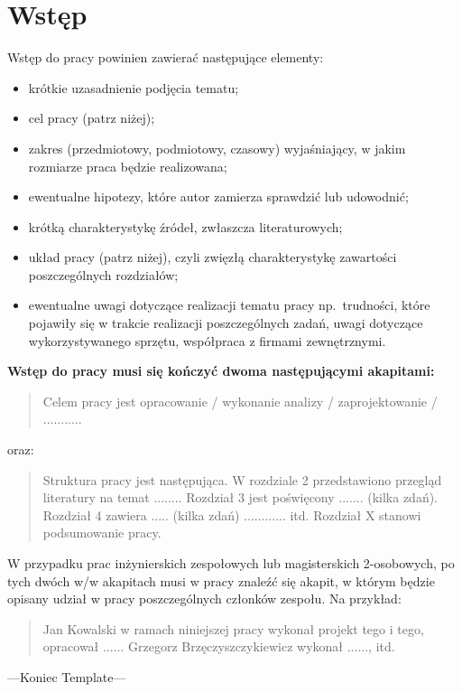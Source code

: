 
\chapter{Wstęp}

Wstęp do pracy powinien zawierać następujące elementy:
\begin{itemize}
    \item krótkie uzasadnienie podjęcia tematu;
    \item cel pracy (patrz niżej);
    \item zakres (przedmiotowy, podmiotowy, czasowy) wyjaśniający, w jakim rozmiarze praca będzie realizowana;
    \item ewentualne hipotezy, które autor zamierza sprawdzić lub udowodnić;
    \item krótką charakterystykę źródeł, zwłaszcza literaturowych;
    \item układ pracy (patrz niżej), czyli zwięzłą charakterystykę zawartości poszczególnych rozdziałów;
    \item ewentualne uwagi dotyczące realizacji tematu pracy np.~trudności, które pojawiły się w trakcie
    realizacji poszczególnych zadań, uwagi dotyczące wykorzystywanego sprzętu, współpraca z firmami zewnętrznymi.
\end{itemize}

\noindent
\textbf{Wstęp do pracy musi się kończyć dwoma następującymi akapitami:}
\begin{quote}
Celem pracy jest opracowanie / wykonanie analizy / zaprojektowanie / ...........
\end{quote}
oraz:
\begin{quote}
Struktura pracy jest następująca. W rozdziale 2 przedstawiono przegląd literatury na temat ........
Rozdział 3 jest poświęcony ....... (kilka zdań).
Rozdział 4 zawiera ..... (kilka zdań) ............ itd.
Rozdział X stanowi podsumowanie pracy.
\end{quote}

W przypadku prac inżynierskich zespołowych lub magisterskich 2-osobowych, po tych dwóch w/w akapitach
musi w pracy znaleźć się akapit, w którym będzie opisany udział w pracy poszczególnych członków zespołu. Na przykład:

\begin{quote}
Jan Kowalski w ramach niniejszej pracy wykonał projekt tego i tego, opracował ......
Grzegorz Brzęczyszczykiewicz wykonał ......, itd.
\end{quote}

---Koniec Template---

